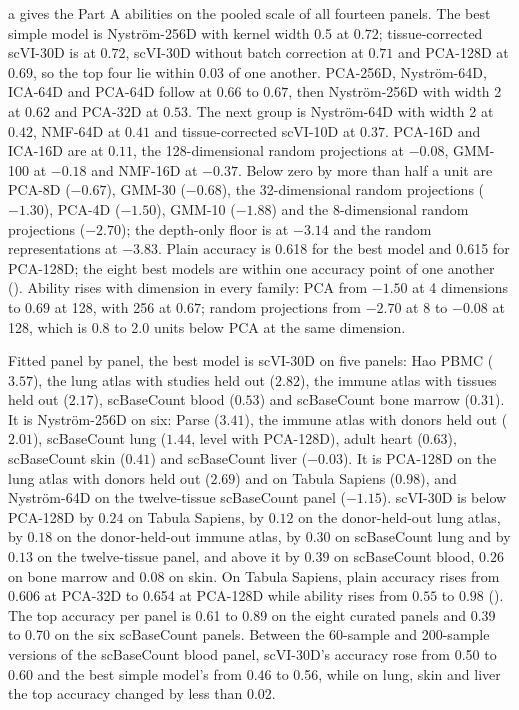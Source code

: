 \documentclass[]{style}
\begin{document}
a gives the Part A abilities on the pooled scale of all fourteen
panels. The best simple model is Nystr\"om-256D with kernel width 0.5 at $0.72$;
tissue-corrected scVI-30D is at $0.72$, scVI-30D without batch correction at $0.71$ and
PCA-128D at $0.69$, so the top four lie within $0.03$ of one another. PCA-256D,
Nystr\"om-64D, ICA-64D and PCA-64D follow at $0.66$ to $0.67$, then Nystr\"om-256D with
width 2 at $0.62$ and PCA-32D at $0.53$. The next group is Nystr\"om-64D with width 2 at
$0.42$, NMF-64D at $0.41$ and tissue-corrected scVI-10D at $0.37$. PCA-16D and ICA-16D are
at $0.11$, the 128-dimensional random projections at $-0.08$, GMM-100 at $-0.18$ and
NMF-16D at $-0.37$. Below zero by more than half a unit are PCA-8D ($-0.67$), GMM-30
($-0.68$), the 32-dimensional random projections ($-1.30$), PCA-4D ($-1.50$), GMM-10
($-1.88$) and the 8-dimensional random projections ($-2.70$); the depth-only floor is at
$-3.14$ and the random representations at $-3.83$. Plain accuracy is 0.618 for the best
model and 0.615 for PCA-128D; the eight best models are within one accuracy point of one
another (). Ability rises with dimension in every family: PCA from
$-1.50$ at 4 dimensions to $0.69$ at 128, with 256 at $0.67$; random projections from
$-2.70$ at 8 to $-0.08$ at 128, which is 0.8 to 2.0 units below PCA at the same dimension.

Fitted panel by panel, the best model is scVI-30D on five panels: Hao PBMC ($3.57$), the
lung atlas with studies held out ($2.82$), the immune atlas with tissues held out
($2.17$), scBaseCount blood ($0.53$) and scBaseCount bone marrow ($0.31$). It is
Nystr\"om-256D on six: Parse ($3.41$), the immune atlas with donors held out ($2.01$),
scBaseCount lung ($1.44$, level with PCA-128D), adult heart ($0.63$), scBaseCount skin
($0.41$) and scBaseCount liver ($-0.03$). It is PCA-128D on the lung atlas with donors
held out ($2.69$) and on Tabula Sapiens ($0.98$), and Nystr\"om-64D on the twelve-tissue
scBaseCount panel ($-1.15$). scVI-30D is below PCA-128D by $0.24$ on Tabula Sapiens, by
$0.12$ on the donor-held-out lung atlas, by $0.18$ on the donor-held-out immune atlas, by
$0.30$ on scBaseCount lung and by $0.13$ on the twelve-tissue panel, and above it by
$0.39$ on scBaseCount blood, $0.26$ on bone marrow and $0.08$ on skin. On Tabula Sapiens,
plain accuracy rises from 0.606 at PCA-32D to 0.654 at PCA-128D while ability rises from
$0.55$ to $0.98$ (). The top accuracy per panel is 0.61 to 0.89 on the
eight curated panels and 0.39 to 0.70 on the six scBaseCount panels. Between the
60-sample and 200-sample versions of the scBaseCount blood panel, scVI-30D's accuracy rose
from 0.50 to 0.60 and the best simple model's from 0.46 to 0.56, while on lung, skin and
liver the top accuracy changed by less than 0.02.
\end{document}
